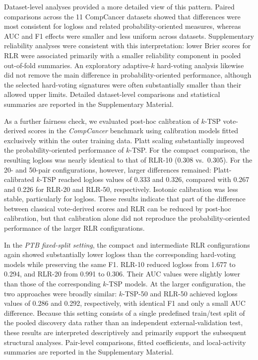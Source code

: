 \documentclass[journal]{IEEEtran}
\begin{document}
Dataset-level analyses provided a more detailed view of this pattern. Paired comparisons across the 11 CompCancer datasets showed that differences were most consistent for logloss and related probability-oriented measures, whereas AUC and F1 effects were smaller and less uniform across datasets. Supplementary reliability analyses were consistent with this interpretation: lower Brier scores for RLR were associated primarily with a smaller reliability component in pooled out-of-fold summaries. An exploratory adaptive-$k$ hard-voting analysis likewise did not remove the main difference in probability-oriented performance, although the selected hard-voting signatures were often substantially smaller than their allowed upper limits. Detailed dataset-level comparisons and statistical summaries are reported in the Supplementary Material.

As a further fairness check, we evaluated post-hoc calibration of $k$-TSP vote-derived scores in the \emph{CompCancer} benchmark using calibration models fitted exclusively within the outer training data. Platt scaling substantially improved the probability-oriented performance of $k$-TSP. For the compact comparison, the resulting logloss was nearly identical to that of RLR-10 (0.308 vs.\ 0.305). For the 20- and 50-pair configurations, however, larger differences remained: Platt-calibrated $k$-TSP reached logloss values of 0.333 and 0.326, compared with 0.267 and 0.226 for RLR-20 and RLR-50, respectively. Isotonic calibration was less stable, particularly for logloss. These results indicate that part of the difference between classical vote-derived scores and RLR can be reduced by post-hoc calibration, but that calibration alone did not reproduce the probability-oriented performance of the larger RLR configurations.

In the \emph{PTB fixed-split setting}, the compact and intermediate RLR configurations again showed substantially lower logloss than the corresponding hard-voting models while preserving the same F1. RLR-10 reduced logloss from 1.677 to 0.294, and RLR-20 from 0.991 to 0.306. Their AUC values were slightly lower than those of the corresponding $k$-TSP models. At the larger configuration, the two approaches were broadly similar: $k$-TSP-50 and RLR-50 achieved logloss values of 0.286 and 0.292, respectively, with identical F1 and only a small AUC difference. Because this setting consists of a single predefined train/test split of the pooled discovery data rather than an independent external-validation test, these results are interpreted descriptively and primarily support the subsequent structural analyses. Pair-level comparisons, fitted coefficients, and local-activity summaries are reported in the Supplementary Material.
\end{document}
